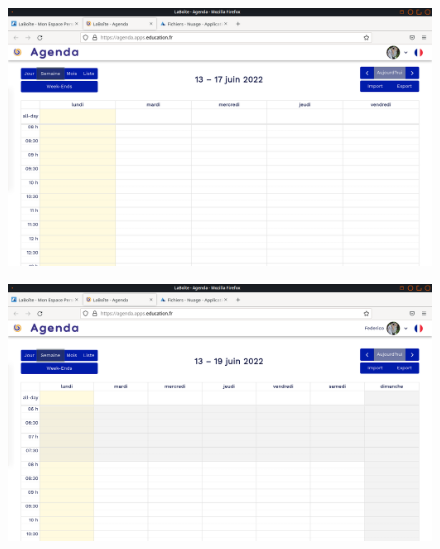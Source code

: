\documentclass[a4paper, 11pt]{book}
\renewcommand{\baselinestretch}{1.25}
\begin{document}
\begin{figure}
    \centering
    \includegraphics{Captures/agenda.semaine.png}
\end{figure}

\begin{figure}
    \centering
    \includegraphics{Captures/agenda.semaine.we.png}
\end{figure}




\newpage
\renewcommand{\baselinestretch}{1}
\setlength{\parskip}{0em}
\tableofcontents
\end{document}
